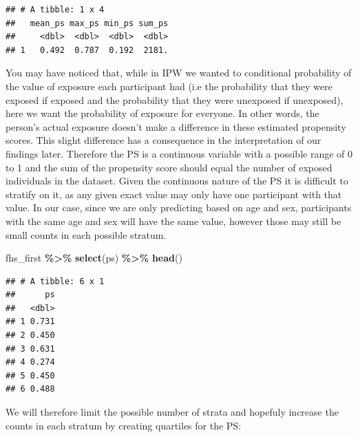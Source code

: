 \documentclass[
]{book}
\newenvironment{Shaded}{\begin{snugshade}}{\end{snugshade}}
\newcommand{\FunctionTok}[1]{\textcolor[rgb]{0.13,0.29,0.53}{\textbf{#1}}}
\newcommand{\NormalTok}[1]{#1}
\newcommand{\SpecialCharTok}[1]{\textcolor[rgb]{0.81,0.36,0.00}{\textbf{#1}}}
\begin{document}
\begin{verbatim}
## # A tibble: 1 x 4
##   mean_ps max_ps min_ps sum_ps
##     <dbl>  <dbl>  <dbl>  <dbl>
## 1   0.492  0.787  0.192  2181.
\end{verbatim}

You may have noticed that, while in IPW we wanted to conditional probability of the value of exposure each participant had (i.e the probability that they were exposed if exposed and the probability that they were unexposed if unexposed), here we want the probability of exposure for everyone. In other words, the person's actual exposure doesn't make a difference in these estimated propensity scores. This slight difference has a consequence in the interpretation of our findings later. Therefore the PS is a continuous variable with a possible range of 0 to 1 and the sum of the propensity score should equal the number of exposed individuals in the dataset. Given the continuous nature of the PS it is difficult to stratify on it, as any given exact value may only have one participant with that value. In our case, since we are only predicting based on age and sex, participants with the same age and sex will have the same value, however those may still be small counts in each possible stratum.

\begin{Shaded}
\begin{Highlighting}[]
\NormalTok{fhs\_first }\SpecialCharTok{\%\textgreater{}\%}
  \FunctionTok{select}\NormalTok{(ps) }\SpecialCharTok{\%\textgreater{}\%}
  \FunctionTok{head}\NormalTok{()}
\end{Highlighting}
\end{Shaded}

\begin{verbatim}
## # A tibble: 6 x 1
##      ps
##   <dbl>
## 1 0.731
## 2 0.450
## 3 0.631
## 4 0.274
## 5 0.450
## 6 0.488
\end{verbatim}

We will therefore limit the possible number of strata and hopefuly increase the counts in each stratum by creating quartiles for the PS:
\end{document}
